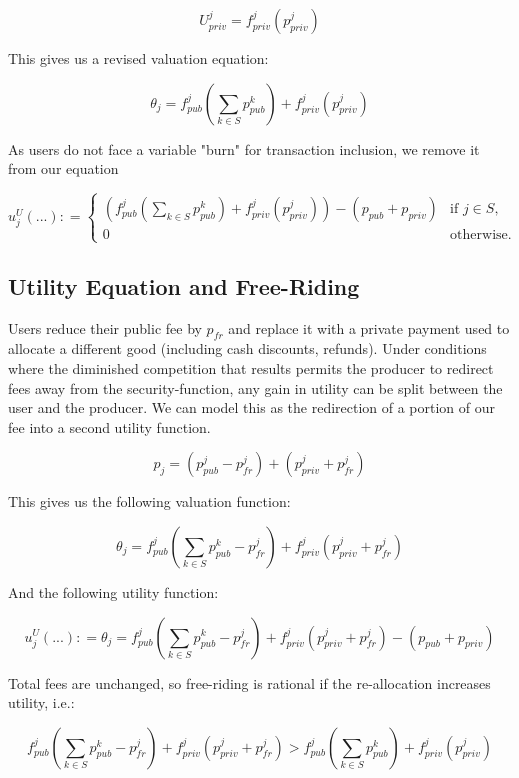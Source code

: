 \documentclass[oneside]{article}   	%
\begin{document}
$$
U_{priv}^j = f_{priv}^j(p_{priv}^j)
$$

This gives us a revised valuation equation:

$$
\theta_j = f_{pub}^j\left(\sum_{k \in S} p_{pub}^{k}\right) + f_{priv}^j(p_{priv}^j)
$$

As users do not face a variable "burn" for transaction inclusion, we remove it from our equation

\[
u_j^U\left(...\right) : =
\begin{cases}
\left(
	f_{pub}^j
		\left(\sum_{k \in S} p_{pub}^{k}\right) 
		+ f_{priv}^j(p_{priv}^j) 
\right)  -   \left(p_{pub} + p_{priv}\right) & \text{if } j \in S, \\ 0 & \text{otherwise.}
\end{cases}
\]

\subsection*{Utility Equation and Free-Riding}

Users reduce their public fee by $p_{fr}$ and replace it with a private payment used to allocate a different good (including cash discounts, refunds). Under conditions where the diminished competition that results permits the producer to redirect fees away from the security-function, any gain in utility can be split between the user and the producer. We can model this as the redirection of a portion of our fee into a second utility function.

$$
p_j = \left( p_{pub}^j - p_{fr}^j \right) + \left( p_{priv}^j + p_{fr}^j \right)
$$

This gives us the following valuation function:

$$
\theta_j = f_{pub}^j\left(\sum_{k \in S} p_{pub}^{k} - p_{fr}^j \right) + f_{priv}^j( p_{priv}^j + p_{fr}^j )
$$

And the following utility function:

$$
u_j^U\left(...\right) : =
\theta_j = f_{pub}^j\left(\sum_{k \in S} p_{pub}^{k} - p_{fr}^j \right) + f_{priv}^j( p_{priv}^j + p_{fr}^j )  -  \left(p_{pub} + p_{priv}\right)
$$

Total fees are unchanged, so free-riding is rational if the re-allocation increases utility, i.e.:

\[
f_{pub}^j\left(\sum_{k \in S} p_{pub}^{k} - p_{fr}^j \right) + f_{priv}^j( p_{priv}^j + p_{fr}^j )
> 
f_{pub}^j\left(\sum_{k \in S} p_{pub}^{k}\right) + f_{priv}^j(p_{priv}^j)
\]
\end{document}
